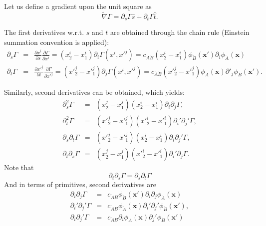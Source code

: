 \documentclass[11pt]{amsart}
\newcommand{\vecx}{\boldsymbol{x}}
\newcommand{\tnabla}{\tilde{\nabla}}
\newcommand{\ds}{\partial_{s}}
\newcommand{\us}{\hat{s}}
\newcommand{\dt}{\partial_{t}}
\newcommand{\ut}{\hat{t}}
\newcommand{\dA}{\dot{A}}
\newcommand{\dB}{\dot{B}}
\begin{document}
Let us define a gradient upon the unit square as
\begin{equation}
   \tnabla\Gamma=\ds\Gamma\us+\dt\Gamma\ut.
\end{equation}

The first derivatives w.r.t. $s$ and $t$ are obtained through the chain rule
(Einstein summation convention is applied):
%
\begin{subequations}
\begin{eqnarray}
   \partial_s\Gamma
   &=&\frac{\partial x^i}{\partial s}\frac{\partial\Gamma}{\partial x^i}
   =(x^i_2-x^i_1)\partial_i\Gamma(x^i,x'^j)
   =c_{\dA\dB}(x^i_2-x^i_1)\phi_{\dB}(\vecx')\partial_i\phi_{\dA}(\vecx)\\
   \partial_t\Gamma
   &=&\frac{\partial x'^j}{\partial t}\frac{\partial\Gamma}{\partial x'^j}
   =(x'^j_2-x'^j_1)\partial_j\Gamma(x^i,x'^j)
   =c_{\dA\dB}(x'^j_2-x'^j_1)\phi_{\dA}(\vecx)\partial'_j\phi_{\dB}(\vecx').
\end{eqnarray}
\end{subequations}
%

Similarly, second derivatives can be obtained, which yields:
%
\begin{subequations}
\begin{eqnarray}
   \partial_s^2\Gamma &=& (x^j_2-x^j_1)(x^i_2-x^i_1)\partial_i\partial_j\Gamma,\\
   \partial_t^2\Gamma &=& (x'^j_2-x'^j_1)(x'^i_2-x'^i_1)\partial_i'\partial_j'\Gamma,\\
   \partial_s\partial_t\Gamma &=& (x'^j_2-x'^j_1)(x^i_2-x^i_1)\partial_i\partial_j'\Gamma,\\
   \partial_t\partial_s\Gamma &=& (x^j_2-x^j_1)(x'^i_2-x'^i_1)\partial_i'\partial_j\Gamma.
\end{eqnarray}
\end{subequations}
%
Note that
%
\begin{equation}
   \partial_t\partial_s\Gamma=\partial_s\partial_t\Gamma
\end{equation}
%
And in terms of primitives, second derivatives are
%
\begin{subequations}
\begin{eqnarray}
   \partial_i\partial_j\Gamma&=&c_{\dA\dB}\phi_{\dB}(\vecx')
      \partial_i\partial_j\phi_{\dA}(\vecx)\\
   \partial_i'\partial_j'\Gamma&=&c_{\dA\dB}\phi_{\dA}(\vecx)
      \partial_i'\partial_j'\phi_{\dB}(\vecx'),\\
      \partial_i\partial_j'\Gamma&=&c_{\dA\dB}\partial_i\phi_{\dA}(\vecx)
      \partial_j'\phi_{\dB}(\vecx')
\end{eqnarray}
\end{subequations}
%
\end{document}
